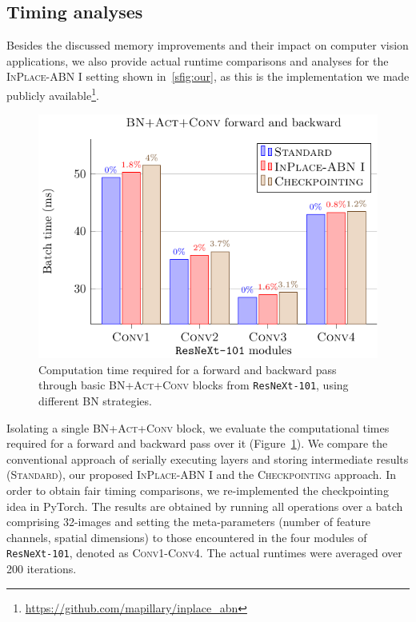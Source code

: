 \documentclass[10pt,twocolumn,letterpaper]{article}
\newcommand{\bnInplace}{\textsc{InPlace-ABN}\xspace}
\begin{document}
\subsection{Timing analyses}\label{ssec:Timings}
Besides the discussed memory improvements and their impact on computer vision applications, we also provide actual runtime comparisons and analyses for the \bnInplace I setting shown in~\ref{sfig:our}, as this is the implementation we made publicly available\footnote{\url{https://github.com/mapillary/inplace_abn}}.
\begin{figure}[b]
  \centering
  \includegraphics[width=\columnwidth]{times.pdf}
  \caption{Computation time required for a forward and backward pass through basic \textsc{BN+Act+Conv} blocks
  from \texttt{ResNeXt-101}, using different \textsc{BN} strategies.}
  \label{fig:times}
\end{figure}
Isolating a single \textsc{BN+Act+Conv} block, we evaluate the computational times required for a forward and backward pass over it (Figure~\ref{fig:times}). We compare the conventional approach of serially executing layers and storing intermediate results (\textsc{Standard}), our proposed \bnInplace I and the \textsc{Checkpointing} approach. In order to obtain fair timing comparisons, we re-implemented the checkpointing idea in PyTorch. 
The results are obtained by running all operations over a batch comprising 32-images and setting the meta-parameters (number of feature channels, spatial dimensions) to those encountered in the four modules of \texttt{ResNeXt-101}, denoted as \textsc{Conv1}-\textsc{Conv4}. The actual runtimes were averaged over 200 iterations. 
\end{document}
